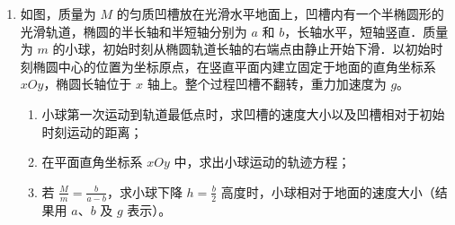 \documentclass[\gkver]{gaokaozhenti}
\begin{document}
\begin{enumerate}
{（3）释放 b 棒后 a 棒受到沿斜面向上的安培力，在到达共速时对 a 棒动量定理

 $mg\sin\theta t_{0}-B\overline{I}L t_{0}=mv-mv_{0}$

b 棒受到向下的安培力，对 b 棒动量定理

 $mg\sin\theta t_{0}+B\overline{I}L t_{0}=mv$

联立解得  $v = g \sin \theta \cdot t_{0} + \frac{v_{0}}{2}$

此过程流过 b 棒的电荷量为 q，则有  $q = \overline{I} t_{0}$

由法拉第电磁感应定律可得

 $\overline{I}=\frac{\overline{E}}{2R}=\frac{1}{2R}\frac{BL\Delta x}{t_{0}}$

联立 b 棒动量定理可得  $\Delta x = \frac{mv_{0}R}{B^{2}L^{2}}$
}

\item
如图，质量为 $M$ 的匀质凹槽放在光滑水平地面上，凹槽内有一个半椭圆形的光滑轨道，椭圆的半长轴和半短轴分别为 $a$ 和 $b$，长轴水平，短轴竖直．质量为 $m$ 的小球，初始时刻从椭圆轨道长轴的右端点由静止开始下滑．以初始时刻椭圆中心的位置为坐标原点，在竖直平面内建立固定于地面的直角坐标系 $xOy$，椭圆长轴位于 $x$ 轴上。整个过程凹槽不翻转，重力加速度为 $g$。
\begin{enumerate}
	\item
	小球第一次运动到轨道最低点时，求凹槽的速度大小以及凹槽相对于初始时刻运动的距离；
	\item
	在平面直角坐标系 $xOy$ 中，求出小球运动的轨迹方程；
	\item
	若 $\frac{M}{m} = \frac{b}{{a - b}}$，求小球下降 $h = \frac{b}{2}$ 高度时，小球相对于地面的速度大小（结果用 $a$、$b$ 及 $g$ 表示）。
\end{enumerate}
\end{enumerate}
\end{document}
